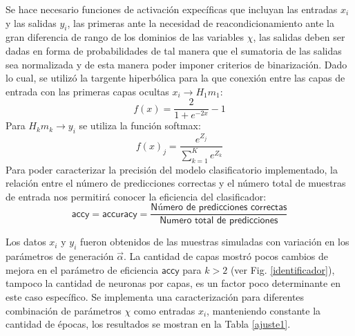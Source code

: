 Se hace necesario funciones de activación expecíficas que incluyan las entradas $x_i$ y las salidas $y_i$, las primeras ante la necesidad de reacondicionamiento ante la gran diferencia de rango de los dominios de las variables $\chi$, las salidas deben ser dadas en forma de probabilidades de tal manera que el sumatoria de las salidas sea normalizada y de esta manera poder imponer criterios de binarización. Dado lo cual, se utilizó la targente hiperbólica para la que conexión entre las capas de entrada con las primeras capas ocultas $x_i \longrightarrow H_1m_1$:
\begin{equation}
f(x)=\dfrac{2}{1+e^{-2x}}-1
\end{equation}
Para $H_km_k \longrightarrow y_i$ se utiliza la función softmax:
\begin{equation}
f(x)_j = \dfrac{e^{Z_j}}{\sum_{k=1}^{K}e^{Z_k}}
\end{equation}
Para poder caracterizar la precisión del modelo clasificatorio implementado, la relación entre el número de predicciones correctas y el número total de muestras de entrada nos permitirá conocer la eficiencia del clasificador:
\begin{equation}
\textsf{accy} =  \textsf{accuracy} = \dfrac{\textsf{Número de predicciones correctas}}{\textsf{Numero total de predicciones}}
\end{equation}

Los datos $x_i$ y $y_i$ fueron obtenidos de las muestras simuladas con variación en los parámetros de generación $\vec{\alpha}$. La cantidad de capas mostró pocos cambios de mejora en el parámetro de eficiencia $\textsf{accy} $ para $k>2$ (ver Fig. \ref{identificador}), tampoco la cantidad de neuronas por capas, es un factor poco determinante en este caso específico. Se implementa una caracterización para diferentes combinación de parámetros $\chi$ como entradas $x_i$, manteniendo constante la cantidad de épocas, los resultados se mostran en la Tabla 
\ref{ajuste1}.

